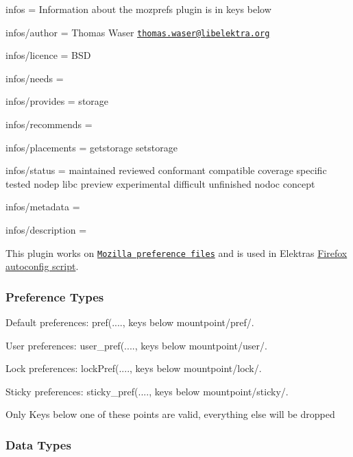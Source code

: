 
\begin{DoxyItemize}
\item infos = Information about the mozprefs plugin is in keys below
\item infos/author = Thomas Waser \href{mailto:thomas.waser@libelektra.org}{\tt thomas.\+waser@libelektra.\+org}
\item infos/licence = B\+S\+D
\item infos/needs =
\item infos/provides = storage
\item infos/recommends =
\item infos/placements = getstorage setstorage
\item infos/status = maintained reviewed conformant compatible coverage specific tested nodep libc preview experimental difficult unfinished nodoc concept
\item infos/metadata =
\item infos/description =
\end{DoxyItemize}

This plugin works on \href{https://developer.mozilla.org/en-US/docs/Mozilla/Preferences/A_brief_guide_to_Mozilla_preferences}{\tt Mozilla preference files} and is used in Elektras \hyperlink{md_src_plugins_mozprefs_autoconfig_README_src_plugins_mozprefs_autoconfig_README_md}{Firefox autoconfig script}.

\subsubsection*{Preference Types}


\begin{DoxyItemize}
\item Default preferences\+: {\ttfamily pref(....}, keys below {\ttfamily mountpoint/pref/}.
\item User preferences\+: {\ttfamily user\+\_\+pref(....}, keys below {\ttfamily mountpoint/user/}.
\item Lock preferences\+: {\ttfamily lock\+Pref(....}, keys below {\ttfamily mountpoint/lock/}.
\item Sticky preferences\+: {\ttfamily sticky\+\_\+pref(....}, keys below {\ttfamily mountpoint/sticky/}.
\end{DoxyItemize}

Only Keys below one of these points are valid, everything else will be dropped

\subsubsection*{Data Types}


